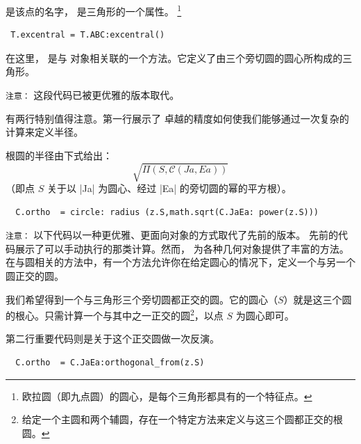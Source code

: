  是该点的名字， 是三角形的一个属性。
\footnote{欧拉圆（即九点圆）的圆心，是每个三角形都具有的一个特征点。}

\begin{mybox}
\begin{verbatim}
 T.excentral = T.ABC:excentral()
\end{verbatim}
\end{mybox}

在这里， 是与  对象相关联的一个方法。它定义了由三个旁切圆的圆心所构成的三角形。


\begin{tcolorbox}[
  title=已弃用代码,
  colframe=red!50,
  colback=red!5,
  coltitle=black,
  sharp corners,
  fonttitle=\bfseries,
  leftrule=1mm,
  rightrule=1mm,
  toprule=0.5mm,
  bottomrule=0.5mm
]
\texttt{注意：} 这段代码已被更优雅的版本取代。

有两行特别值得注意。第一行展示了  卓越的精度如何使我们能够通过一次复杂的计算来定义半径。

根圆的半径由下式给出：
\[
\sqrt{\Pi(S,\mathcal{C}(Ja,Ea))}
\]
（即点 $S$ 关于以 |Ja| 为圆心、经过 |Ea| 的旁切圆的幂的平方根）。

\begin{mybox}{}
\begin{verbatim}
  C.ortho  = circle: radius (z.S,math.sqrt(C.JaEa: power(z.S)))
\end{verbatim}
\end{mybox}
\end{tcolorbox}

\begin{tcolorbox}[
  title=修订后的代码,
  colframe=cyan!60!black,
  colback=cyan!5,
  coltitle=white,
  sharp corners,
  fonttitle=\bfseries,
  leftrule=1mm,
  rightrule=1mm,
  toprule=0.5mm,
  bottomrule=0.5mm
]
\texttt{注意：} 以下代码以一种更优雅、更面向对象的方式取代了先前的版本。
先前的代码展示了可以手动执行的那类计算。然而， 为各种几何对象提供了丰富的方法。在与圆相关的方法中，有一个方法允许你在给定圆心的情况下，定义一个与另一个圆正交的圆。

我们希望得到一个与三角形三个旁切圆都正交的圆。它的圆心（$S$）就是这三个圆的根心。只需计算一个与其中之一正交的圆\footnote{给定一个主圆和两个辅圆，存在一个特定方法来定义与这三个圆都正交的根圆。}，以点 $S$ 为圆心即可。

第二行重要代码则是关于这个正交圆做一次反演。

\begin{mybox}{}
\begin{verbatim}
  C.ortho  = C.JaEa:orthogonal_from(z.S)
\end{verbatim}
\end{mybox}
\end{tcolorbox}

